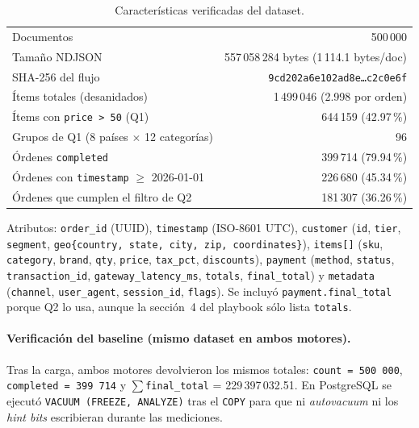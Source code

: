 \documentclass[11pt,a4paper]{article}
\begin{document}
\begin{table}[H]
\centering\small
\caption{Características verificadas del dataset.}\label{tab:dataset}
\begin{tabular}{lr}
\toprule
Documentos & 500\,000 \\
Tamaño NDJSON & 557\,058\,284 bytes (1\,114.1 bytes/doc) \\
SHA-256 del flujo & \texttt{9cd202a6e102ad8e\ldots c2c0e6f} \\
Ítems totales (desanidados) & 1\,499\,046 (2.998 por orden) \\
Ítems con \texttt{price > 50} (Q1) & 644\,159 (42.97\,\%) \\
Grupos de Q1 (8 países $\times$ 12 categorías) & 96 \\
Órdenes \texttt{completed} & 399\,714 (79.94\,\%) \\
Órdenes con \texttt{timestamp} $\geq$ 2026-01-01 & 226\,680 (45.34\,\%) \\
Órdenes que cumplen el filtro de Q2 & 181\,307 (36.26\,\%) \\
\bottomrule
\end{tabular}
\end{table}

Atributos: \texttt{order\_id} (UUID), \texttt{timestamp} (ISO-8601 UTC), \texttt{customer} (\texttt{id}, \texttt{tier}, \texttt{segment}, \texttt{geo\{country, state, city, zip, coordinates\}}), \texttt{items[]} (\texttt{sku}, \texttt{category}, \texttt{brand}, \texttt{qty}, \texttt{price}, \texttt{tax\_pct}, \texttt{discounts}), \texttt{payment} (\texttt{method}, \texttt{status}, \texttt{transaction\_id}, \texttt{gateway\_latency\_ms}, \texttt{totals}, \texttt{final\_total}) y \texttt{metadata} (\texttt{channel}, \texttt{user\_agent}, \texttt{session\_id}, \texttt{flags}). Se incluyó \texttt{payment.final\_total} porque Q2 lo usa, aunque la sección~4 del playbook sólo lista \texttt{totals}.

\paragraph{Verificación del baseline (mismo dataset en ambos motores).} Tras la carga, ambos motores devolvieron los mismos totales: \texttt{count = 500\,000}, \texttt{completed = 399\,714} y $\sum$\texttt{final\_total} = 229\,397\,032.51. En PostgreSQL se ejecutó \texttt{VACUUM (FREEZE, ANALYZE)} tras el \texttt{COPY} para que ni \emph{autovacuum} ni los \emph{hint bits} escribieran durante las mediciones.
\end{document}
